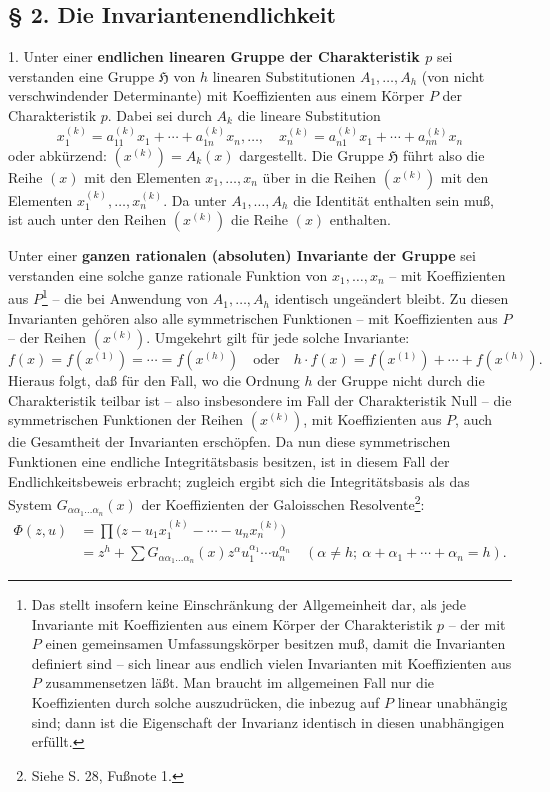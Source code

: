 \subsection*{§ 2. Die Invariantenendlichkeit}

1. Unter einer \textbf{endlichen linearen Gruppe der Charakteristik $p$} sei verstanden eine Gruppe $\mathfrak H$ von $h$ linearen Substitutionen $A_1,\ldots,A_h$ (von nicht verschwindender Determinante) mit Koeffizienten aus einem Körper $P$ der Charakteristik $p$. Dabei sei durch $A_k$ die lineare Substitution
\[
 x_1^{(k)}=a_{11}^{(k)}x_1+\cdots+a_{1n}^{(k)}x_n,\ldots,\quad
 x_n^{(k)}=a_{n1}^{(k)}x_1+\cdots+a_{nn}^{(k)}x_n
\]
oder abkürzend: $(x^{(k)})=A_k(x)$ dargestellt. Die Gruppe $\mathfrak H$ führt also die Reihe $(x)$ mit den Elementen $x_1,\ldots,x_n$ über in die Reihen $(x^{(k)})$ mit den Elementen $x_1^{(k)},\ldots,x_n^{(k)}$. Da unter $A_1,\ldots,A_h$ die Identität enthalten sein muß, ist auch unter den Reihen $(x^{(k)})$ die Reihe $(x)$ enthalten.

Unter einer \textbf{ganzen rationalen (absoluten) Invariante der Gruppe} sei verstanden eine solche ganze rationale Funktion von $x_1,\ldots,x_n$ -- mit Koeffizienten aus $P$\footnote{Das stellt insofern keine Einschränkung der Allgemeinheit dar, als jede Invariante mit Koeffizienten aus einem Körper der Charakteristik $p$ -- der mit $P$ einen gemeinsamen Umfassungskörper besitzen muß, damit die Invarianten definiert sind -- sich linear aus endlich vielen Invarianten mit Koeffizienten aus $P$ zusammensetzen läßt. Man braucht im allgemeinen Fall nur die Koeffizienten durch solche auszudrücken, die inbezug auf $P$ linear unabhängig sind; dann ist die Eigenschaft der Invarianz identisch in diesen unabhängigen erfüllt.} -- die bei Anwendung von $A_1,\ldots,A_h$ identisch ungeändert bleibt. Zu diesen Invarianten gehören also alle symmetrischen Funktionen -- mit Koeffizienten aus $P$ -- der Reihen $(x^{(k)})$. Umgekehrt gilt für jede solche Invariante:
\[
 f(x)=f(x^{(1)})=\cdots=f(x^{(h)})
 \quad\text{oder}\quad
 h\cdot f(x)=f(x^{(1)})+\cdots+f(x^{(h)}).
\]
Hieraus folgt, daß für den Fall, wo die Ordnung $h$ der Gruppe nicht durch die Charakteristik teilbar ist -- also insbesondere im Fall der Charakteristik Null -- die symmetrischen Funktionen der Reihen $(x^{(k)})$, mit Koeffizienten aus $P$, auch die Gesamtheit der Invarianten erschöpfen. Da nun diese symmetrischen Funktionen eine endliche Integritätsbasis besitzen, ist in diesem Fall der Endlichkeitsbeweis erbracht; zugleich ergibt sich die Integritätsbasis als das System $G_{\alpha\alpha_1\ldots\alpha_n}(x)$ der Koeffizienten der Galoisschen Resolvente\footnote{Siehe S. 28, Fußnote 1.}:
\[
\begin{aligned}
\Phi(z,u)&=\prod\bigl(z-u_1x_1^{(k)}-\cdots-u_nx_n^{(k)}\bigr)\\
&=z^h+\sum G_{\alpha\alpha_1\ldots\alpha_n}(x)
 z^{\alpha}u_1^{\alpha_1}\cdots u_n^{\alpha_n}
 \quad(\alpha\ne h;\ \alpha+\alpha_1+\cdots+\alpha_n=h).
\end{aligned}
\]

